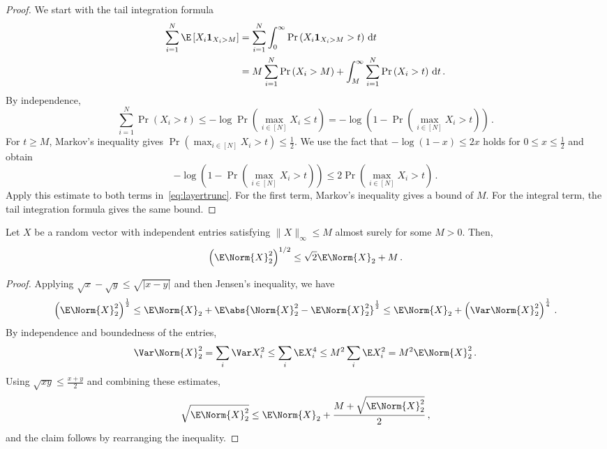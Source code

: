\documentclass[11pt,a4paper]{article}
\begin{document}
\begin{proof}
    We start with the tail integration formula
    \begin{align}
            \sum_{i=1}^N \E \left[X_i \mathbf{1}_{X_i > M}\right] &= \sum_{i=1}^N \int_{0}^{\infty} \Pr \left( X_i \mathbf{1}_{X_i > M}> t  \right) \, \mathrm dt\nonumber\\ 
            &= M \sum_{i=1}^N \Pr \left( X_i> M  \right) + \int_{M}^{\infty} \sum_{i=1}^N \Pr \left( X_i > t  \right) \, \mathrm dt\,.\label{eq:layertrunc}
    \end{align}
    By independence,
    \[
        \sum_{i=1}^N \Pr \left( X_i > t  \right) \leq - \log \Pr \left( \max_{i\in [N]} X_i \leq t  \right) = - \log\left( 1- \Pr\left( \max_{i\in [N]} X_i > t  \right)\right)\,.
    \]
    For $t \geq M$, Markov's inequality gives $\Pr \left( \max_{i\in [N]} X_i > t \right) \leq \frac 12$. We use the fact that $-\log(1-x) \leq 2x$ holds for $0 \leq x \leq \frac 12$ and obtain
    \[
        - \log\left( 1- \Pr \left( \max_{i\in [N]} X_i > t  \right)\right) \leq 2\Pr \left( \max_{i\in [N]} X_i > t  \right)\,.
    \]
    Apply this estimate to both terms in~\eqref{eq:layertrunc}. For the first term, Markov's inequality gives a bound of $M$. For the integral term, the tail integration formula gives the same bound.
\end{proof}

\begin{lemma}\label{claim:boundNorm}
    Let $X$ be a random vector with independent entries
    satisfying $\|X\|_\infty\le M$ 
     almost surely for some $M>0$. Then,
     \[\left(\E \Norm{X}^2_2\right)^{1/2}\le \sqrt 2 \E \Norm{X}_2 + M\,.\]
\end{lemma}

\begin{proof}
    Applying $\sqrt{x} - \sqrt{y}\le \sqrt{|x-y|}$ and then Jensen's inequality, we have
    \[
        \left(\E \Norm{X}_2^2\right)^{\frac 12}\le \E \Norm{X}_2 + \E \abs{\Norm{X}_2^2 - \E \Norm{X}_2^2}^{\frac 12}\le \E \Norm{X}_2 + \left(\Var \Norm{X}_2^2\right)^{\frac 14}\,.
    \]
    By independence and boundedness of the entries,
    \[
        \Var \Norm{X}_2^2 = \sum_i \Var X_i^2\le \sum_i \E X_i^4\le M^2 \sum_i \E X_i^2 = M^2 \E \Norm{X}_2^2\,.
    \]
    Using $\sqrt{xy}\le \frac {x+y} 2$
    and combining these estimates,
    \[
         \sqrt{\E \Norm{X}_2^2}\le \E \Norm{X}_2 + \frac {M + \sqrt{\E \Norm{X}_2^2}} 2\,,
    \]
    and the claim follows by rearranging the inequality.
\end{proof}
\end{document}
